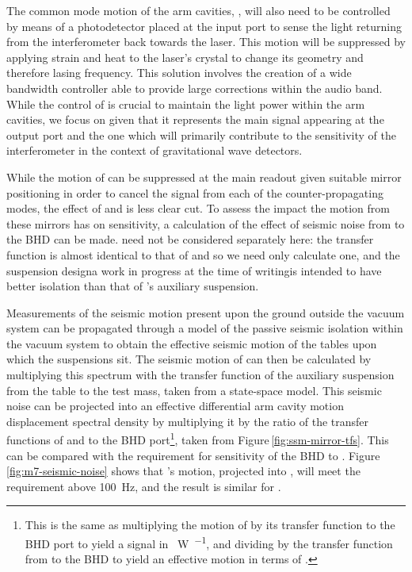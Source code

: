 The common mode motion of the arm cavities, \LPLUS{}, will also need to be controlled by means of a photodetector placed at the input port to sense the light returning from the interferometer back towards the laser. This motion will be suppressed by applying strain and heat to the laser's crystal to change its geometry and therefore lasing frequency. This solution involves the creation of a wide bandwidth controller able to provide large corrections within the audio band. While the control of \LPLUS{} is crucial to maintain the light power within the arm cavities, we focus on \LMINUS{} given that it represents the main signal appearing at the output port and the one which will primarily contribute to the sensitivity of the interferometer in the context of gravitational wave detectors.

While the motion of \MNINE{} can be suppressed at the main readout given suitable mirror positioning in order to cancel the signal from each of the counter-propagating modes, the effect of \MSIX{} and \MSEVEN{} is less clear cut. To assess the impact the motion from these mirrors has on \LMINUS{} sensitivity, a calculation of the effect of seismic noise from \MSEVEN{} to the \gls{BHD} can be made. \MSIX{} need not be considered separately here: the transfer function is almost identical to that of \MSEVEN{} and so we need only calculate one, and the suspension design\textemdash a work in progress at the time of writing\textemdash is intended to have better isolation than that of \MSEVEN{}'s auxiliary suspension.

Measurements of the seismic motion present upon the ground outside the vacuum system can be propagated through a model of the passive seismic isolation within the vacuum system to obtain the effective seismic motion of the tables upon which the suspensions sit. The seismic motion of \MSEVEN{} can then be calculated by multiplying this spectrum with the transfer function of the auxiliary suspension from the table to the test mass, taken from a state-space model. This seismic noise can be projected into an effective differential arm cavity motion displacement spectral density by multiplying it by the ratio of the transfer functions of \MSEVEN{} and \LMINUS{} to the \gls{BHD} port\footnote{This is the same as multiplying the motion of \MSEVEN{} by its transfer function to the \gls{BHD} port to yield a signal in \SI{}{\watt\per\sqrthz}, and dividing by the transfer function from \LMINUS{} to the \gls{BHD} to yield an effective motion in terms of \LMINUS{}.}, taken from Figure\,\ref{fig:ssm-mirror-tfs}. This can be compared with the requirement for sensitivity of the \gls{BHD} to \LMINUS{}. Figure\,\ref{fig:m7-seismic-noise} shows that \MSEVEN{}'s motion, projected into \LMINUS{}, will meet the requirement above \SI{100}{\hertz}, and the result is similar for \MSIX{}.

